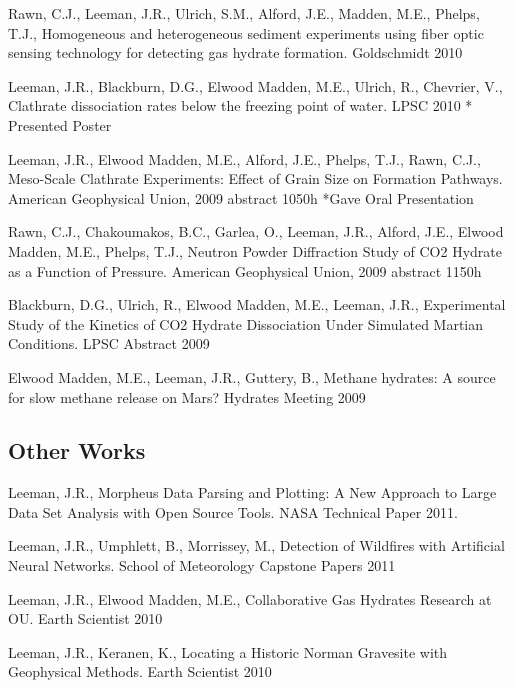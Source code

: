 \documentclass[letterpaper]{article}
\renewenvironment{itemize}{
  \begin{list}{}{
    \setlength{\leftmargin}{1.5em}
  }
}{
  \end{list}
}
\begin{document}
\begin{itemize}
\item Rawn, C.J., Leeman, J.R., Ulrich, S.M., Alford, J.E., Madden, M.E., Phelps, T.J., Homogeneous and heterogeneous sediment experiments using fiber optic sensing technology for detecting gas hydrate formation. Goldschmidt 2010

\item Leeman, J.R., Blackburn, D.G., Elwood Madden, M.E., Ulrich, R., Chevrier, V., Clathrate dissociation rates below the freezing point of water. LPSC 2010 * Presented Poster

\item Leeman, J.R., Elwood Madden, M.E., Alford, J.E., Phelps, T.J., Rawn, C.J., Meso-Scale Clathrate Experiments: Effect of Grain Size on Formation Pathways. American Geophysical Union, 2009 abstract 1050h *Gave Oral Presentation

\item Rawn, C.J., Chakoumakos, B.C., Garlea, O., Leeman, J.R., Alford, J.E., Elwood Madden, M.E., Phelps, T.J., Neutron Powder Diffraction Study of CO2 Hydrate as a Function of Pressure. American Geophysical Union, 2009 abstract 1150h

\item Blackburn, D.G., Ulrich, R., Elwood Madden, M.E., Leeman, J.R., Experimental Study of the Kinetics of CO2 Hydrate Dissociation Under Simulated Martian Conditions. LPSC Abstract 2009

\item Elwood Madden, M.E., Leeman, J.R., Guttery, B., Methane hydrates: A source for slow methane release on Mars? Hydrates Meeting 2009

\end{itemize}

\subsection*{Other Works}
\begin{itemize}

\item  Leeman, J.R., Morpheus Data Parsing and Plotting: A New Approach to Large Data Set Analysis with Open Source Tools.  NASA Technical Paper 2011.

\item Leeman, J.R., Umphlett, B., Morrissey, M., Detection of Wildfires with Artificial Neural Networks.  School of Meteorology Capstone Papers 2011

\item Leeman, J.R., Elwood Madden, M.E.,  Collaborative Gas Hydrates Research at OU. Earth Scientist 2010

\item Leeman, J.R., Keranen, K., Locating a Historic Norman Gravesite with Geophysical Methods. Earth Scientist 2010

\end{itemize}
\end{document}
